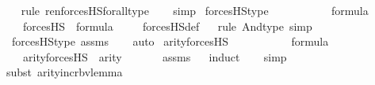 \begin{isabellebody}
\ \ \isamarkupfalse%
{\isacharparenleft}{\kern0pt}rule\ ren{\isacharunderscore}{\kern0pt}forcesHS{\isacharunderscore}{\kern0pt}forall{\isacharunderscore}{\kern0pt}type{\isacharparenright}{\kern0pt}\isanewline
\ \ \isamarkupfalse%
\ simp%
\endisatagproof
{\isafoldproof}%
%
\isadelimproof
\isanewline
%
\endisadelimproof
\isanewline
{}\isamarkupfalse%
\ forcesHS{\isacharunderscore}{\kern0pt}type\ {\isacharcolon}{\kern0pt}\ \isanewline
\ \ \ {\isasymphi}\isanewline
\ \ \ {\isachardoublequoteopen}{\isasymphi}\ {\isasymin}\ formula{\isachardoublequoteclose}\ \isanewline
\ \ \ {\isachardoublequoteopen}forcesHS{\isacharparenleft}{\kern0pt}{\isasymphi}{\isacharparenright}{\kern0pt}\ {\isasymin}\ formula{\isachardoublequoteclose}\ \isanewline
%
\isadelimproof
\ \ %
\endisadelimproof
%
\isatagproof
{}\isamarkupfalse%
\ forcesHS{\isacharunderscore}{\kern0pt}def\isanewline
\ \ \isamarkupfalse%
{\isacharparenleft}{\kern0pt}rule\ And{\isacharunderscore}{\kern0pt}type{\isacharcomma}{\kern0pt}\ simp{\isacharparenright}{\kern0pt}\isanewline
\ \ \isamarkupfalse%
\ forcesHS{\isacharprime}{\kern0pt}{\isacharunderscore}{\kern0pt}type\ assms\isanewline
\ \ \isamarkupfalse%
\ auto%
\endisatagproof
{\isafoldproof}%
%
\isadelimproof
\isanewline
%
\endisadelimproof
\isanewline
{}\isamarkupfalse%
\ arity{\isacharunderscore}{\kern0pt}forcesHS{\isacharprime}{\kern0pt}\ {\isacharcolon}{\kern0pt}\ \isanewline
\ \ \ {\isasymphi}\isanewline
\ \ \ {\isachardoublequoteopen}{\isasymphi}\ {\isasymin}\ formula{\isachardoublequoteclose}\ \isanewline
\ \ \ {\isachardoublequoteopen}arity{\isacharparenleft}{\kern0pt}forcesHS{\isacharprime}{\kern0pt}{\isacharparenleft}{\kern0pt}{\isasymphi}{\isacharparenright}{\kern0pt}{\isacharparenright}{\kern0pt}\ {\isasymle}\ arity{\isacharparenleft}{\kern0pt}{\isasymphi}{\isacharparenright}{\kern0pt}\ {\isacharhash}{\kern0pt}{\isacharplus}{\kern0pt}\ {}{\isachardoublequoteclose}\ \isanewline
%
\isadelimproof
\ \ %
\endisadelimproof
%
\isatagproof
{}\isamarkupfalse%
\ assms\isanewline
\ \ \isamarkupfalse%
{\isacharparenleft}{\kern0pt}induct{\isacharparenright}{\kern0pt}\isanewline
\ \ \isamarkupfalse%
\ simp\ \isanewline
\ \ \ \ \ \isamarkupfalse%
{\isacharparenleft}{\kern0pt}subst\ arity{\isacharunderscore}{\kern0pt}incr{\isacharunderscore}{\kern0pt}bv{\isacharunderscore}{\kern0pt}lemma{\isacharparenright}{\kern0pt}\isanewline

\end{isabellebody}
